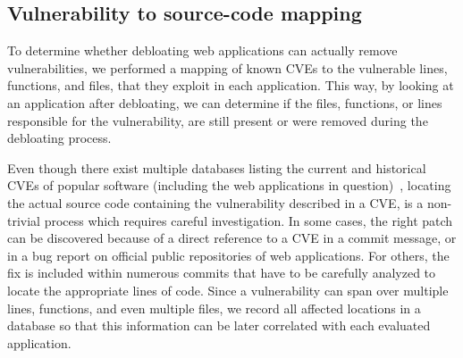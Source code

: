 \begin{table}[]
\centering
\caption{Analyzed open-source web applications.}
\label{table:analyzed_webapps}
\end{table}

\subsection{Vulnerability to source-code mapping}
\label{sec:vulntosourcemapping}
To determine whether debloating web applications can actually remove
vulnerabilities, we performed a mapping of known CVEs to the vulnerable lines,
functions, and files, that they exploit in each application. This way, by
looking at an application after debloating, we can determine if the files,
functions, or lines responsible for the vulnerability, are still present or
were removed during the debloating process.


Even though there exist multiple databases listing the current and
historical CVEs of popular software (including the web applications in
question)~\cite{cvedetails,nistgov}, locating the actual source code
containing the vulnerability described in a CVE, is a non-trivial process
which requires careful investigation. In some cases, the right patch can be
discovered because of a direct reference to a CVE in a commit message, or in
a bug report on official public repositories of web applications. For others,
the fix is included within numerous commits that have to be carefully analyzed
to locate the appropriate lines of code. Since a vulnerability can span over
multiple lines, functions, and even multiple files, we record all affected
locations in a database so that this information can be later correlated
with each evaluated application.


